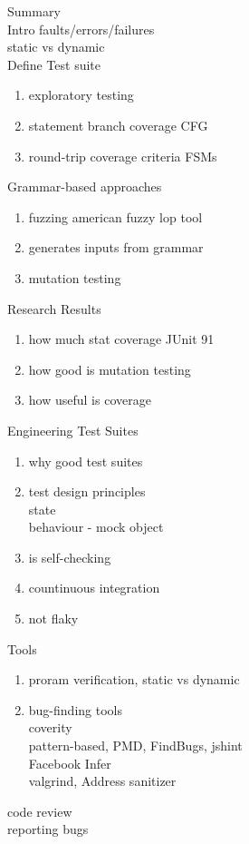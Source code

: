 \documentclass[10pt,usletter]{article}
\newcommand{\tab}[1][1cm]{\hspace*{#1}}
\begin{document}
Summary \\
Intro faults/errors/failures\\
static vs dynamic\\
Define Test suite\\
\begin{enumerate}
\item exploratory testing
\item statement branch coverage
\tab CFG
\item round-trip coverage criteria FSMs
\end{enumerate}
Grammar-based approaches
\begin{enumerate}
\item fuzzing  american fuzzy lop tool
\item generates inputs from grammar
\item mutation testing
\end{enumerate}
Research Results
\begin{enumerate}
\item how much stat coverage JUnit 91%
\item how good is mutation testing
\item how useful is coverage
\end{enumerate}
Engineering Test Suites
\begin{enumerate}
\item why good test suites
\item test design principles\\
\tab state\\
\tab behaviour - mock object
\item is self-checking
\item countinuous integration
\item not flaky
\end{enumerate}
Tools
\begin{enumerate}
\item proram verification, static vs dynamic
\item bug-finding tools\\
\tab coverity\\
\tab pattern-based, PMD, FindBugs, jshint\\
\tab Facebook Infer\\
\tab valgrind, Address sanitizer
\end{enumerate}
code review\\
reporting bugs
\end{document}
